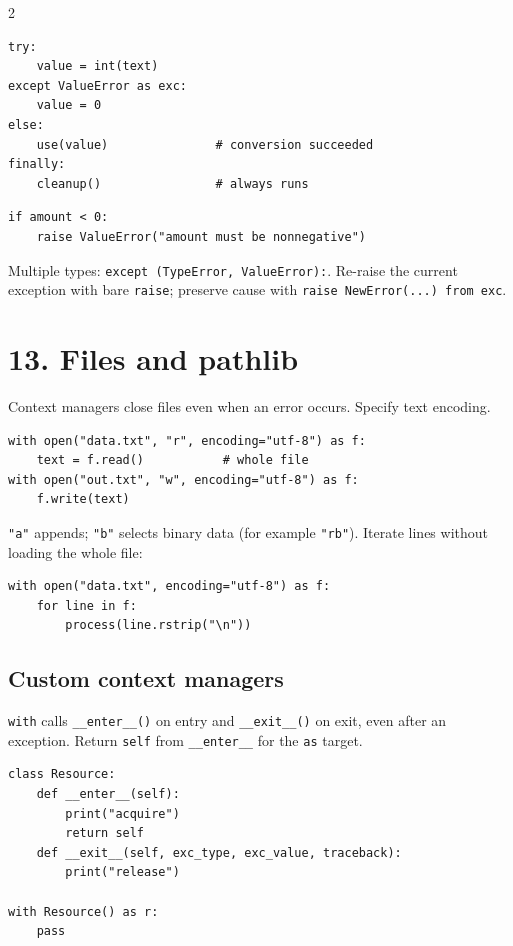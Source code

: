 \documentclass[10pt,a4paper]{article}
\newcommand{\py}[1]{\texttt{#1}}
\begin{document}
\begin{multicols}{2}
\begin{lstlisting}
try:
    value = int(text)
except ValueError as exc:
    value = 0
else:
    use(value)               # conversion succeeded
finally:
    cleanup()                # always runs
\end{lstlisting}

\begin{lstlisting}
if amount < 0:
    raise ValueError("amount must be nonnegative")
\end{lstlisting}

Multiple types: \py{except (TypeError, ValueError):}. Re-raise the current exception with bare \py{raise}; preserve cause with \py{raise NewError(...) from exc}.

\section{13. Files and pathlib}

Context managers close files even when an error occurs. Specify text encoding.

\begin{lstlisting}
with open("data.txt", "r", encoding="utf-8") as f:
    text = f.read()           # whole file
with open("out.txt", "w", encoding="utf-8") as f:
    f.write(text)
\end{lstlisting}

\py{"a"} appends; \py{"b"} selects binary data (for example \py{"rb"}). Iterate lines without loading the whole file:

\begin{lstlisting}
with open("data.txt", encoding="utf-8") as f:
    for line in f:
        process(line.rstrip("\n"))
\end{lstlisting}

\subsection{Custom context managers}

\py{with} calls \py{\_\_enter\_\_()} on entry and \py{\_\_exit\_\_()} on exit, even after an exception. Return \py{self} from \py{\_\_enter\_\_} for the \py{as} target.

\begin{lstlisting}
class Resource:
    def __enter__(self):
        print("acquire")
        return self
    def __exit__(self, exc_type, exc_value, traceback):
        print("release")

with Resource() as r:
    pass
\end{lstlisting}


\end{multicols}
\end{document}
